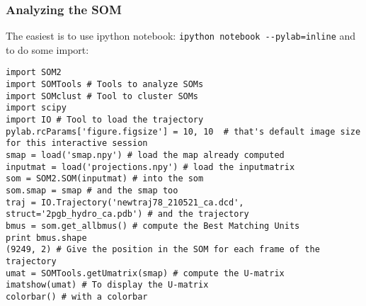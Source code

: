 \begin{frame}[fragile]
    \frametitle{Analyzing the SOM}
    The easiest is to use ipython notebook: \lstinline{ipython notebook --pylab=inline}
    and to do some import:
    \begin{lstlisting}
import SOM2
import SOMTools # Tools to analyze SOMs
import SOMclust # Tool to cluster SOMs
import scipy
import IO # Tool to load the trajectory
pylab.rcParams['figure.figsize'] = 10, 10  # that's default image size for this interactive session
smap = load('smap.npy') # load the map already computed
inputmat = load('projections.npy') # load the inputmatrix
som = SOM2.SOM(inputmat) # into the som
som.smap = smap # and the smap too
traj = IO.Trajectory('newtraj78_210521_ca.dcd', struct='2pgb_hydro_ca.pdb') # and the trajectory
bmus = som.get_allbmus() # compute the Best Matching Units
print bmus.shape
(9249, 2) # Give the position in the SOM for each frame of the trajectory
umat = SOMTools.getUmatrix(smap) # compute the U-matrix
imatshow(umat) # To display the U-matrix
colorbar() # with a colorbar
    \end{lstlisting}
\end{frame}
